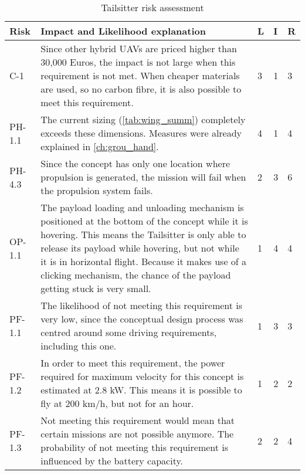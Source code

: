 \begin{table}[]
    \centering
    \caption{Tailsitter risk assessment}
    \label{tab:tail_risk_asse}
    \begin{tabularx}{\textwidth}{l L l l l}
        \toprule
        Risk            & Impact and Likelihood explanation                & L     & I     & R
        \\ \midrule
        C-1             & Since other hybrid UAVs are priced higher than 30,000 Euros\footnotemark, the impact is not large when this requirement is not met. When cheaper materials are used, so no carbon fibre, it is also possible to meet this requirement.                                & 3      & 1     & 3
        \\ \hdashline
        PH-1.1          & The current sizing (\autoref{tab:wing_summ}) completely exceeds these dimensions. Measures were already explained in \autoref{ch:grou_hand}. & 4 & 1 & 4 
        \\ \hdashline
        PH-4.3          & Since the concept has only one location where propulsion is generated, the mission will fail when the propulsion system fails. & 2      & 3     & 6
        \\ \hdashline
        OP-1.1          & The payload loading and unloading mechanism is positioned at the bottom of the concept while it is hovering. This means the Tailsitter is only able to release its payload while hovering, but not while it is in horizontal flight. Because it makes use of a clicking mechanism, the chance of the payload getting stuck is very small.                                                             & 1      & 4     & 4                        
        \\ \hdashline
        PF-1.1          & The likelihood of not meeting this requirement is very low, since the conceptual design process was centred around some driving requirements, including this one.                                                           & 1     & 3     & 3
        \\ \hdashline
        PF-1.2          & In order to meet this requirement, the power required for maximum velocity for this concept is estimated at 2.8 kW. This means it is possible to fly at 200 km/h, but not for an hour.                                                        & 1     & 2     & 2
        \\ \hdashline
        PF-1.3          & Not meeting this requirement would mean that certain missions are not possible anymore. The probability of not meeting this requirement is influenced by the battery capacity.                                               & 2     & 2     & 4

\end{tabularx}
\end{table}
